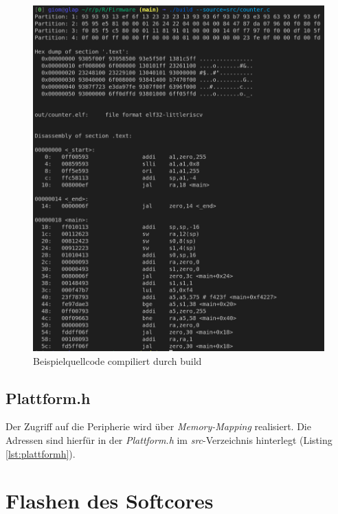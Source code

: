         \begin{figure}[H]
            \centering
            \includegraphics[scale=1]{img/build_example.png}
            \caption{Beispielquellcode compiliert durch build}
            \label{fig:build-example}
        \end{figure}

        \subsection{Plattform.h}
            Der Zugriff auf die Peripherie wird über \textit{Memory-Mapping} realisiert.
            Die Adressen sind hierfür in der \textit{Plattform.h} im \textit{src}-Verzeichnis
            hinterlegt (Listing \ref{lst:plattformh}).
            


    \section{Flashen des Softcores}

